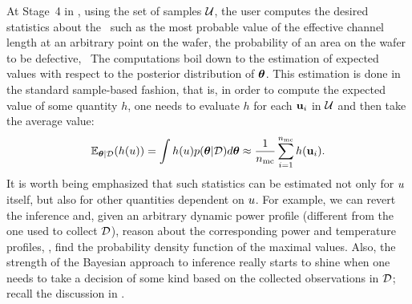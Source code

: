 At Stage~4 in , using the set of samples $\mathcal{U}$, the user computes the desired statistics about the \qoi\ such as the most probable value of the effective channel length at an arbitrary point on the wafer, the probability of an area on the wafer to be defective, \etc\ The computations boil down to the estimation of expected values with respect to the posterior distribution of ${\boldsymbol\theta}$. This estimation is done in the standard sample-based fashion, that is, in order to compute the expected value of some quantity $h$, one needs to evaluate $h$ for each $\mathbf{u}_i$ in $\mathcal{U}$ and then take the average value:
\[
  \E_{\vparam | \Data}(h(\u)) = \int h(\u) \f{\vparam | \Data} d\vparam \approx \frac{1}{\nsamples} \sum_{i = 1}^\nsamples h(\vu_i).
\]
It is worth being emphasized that such statistics can be estimated not only for $u$ itself, but also for other quantities dependent on $u$.
For example, we can revert the inference and, given an arbitrary dynamic power profile (different from the one used to collect $\mathcal{D}$), reason about the corresponding power and temperature profiles, \eg, find the probability density function of the maximal values.
Also, the strength of the Bayesian approach to inference really starts to shine when one needs to take a decision of some kind based on the collected observations in $\mathcal{D}$; recall the discussion in .

